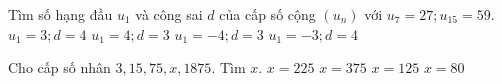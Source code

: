 \begin{ex}%
	Tìm số hạng đầu $ u_1 $ và công sai $ d $ của cấp số cộng $ (u_n) $ với $ u_7=27;u_{15}=59 $.
	\choice
	{\True $ u_1=3;d=4 $}
	{$ u_1=4;d=3 $}
	{$ u_1=-4;d=3 $}
	{$ u_1=-3;d=4 $}
\end{ex}

\begin{ex}%
	Cho cấp số nhân $ 3,15,75,x,1875 $. Tìm $ x $.
	\choice
	{$ x=225 $}
	{\True $ x=375 $}
	{$ x=125 $}
	{$ x=80 $}
\end{ex}


